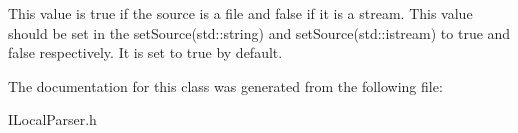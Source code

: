 This value is true if the source is a file and false if it is a stream. This value should be set in the set\+Source(std\+::string) and set\+Source(std\+::istream) to true and false respectively. It is set to true by default. 

The documentation for this class was generated from the following file\+:\begin{DoxyCompactItemize}
\item 
I\+Local\+Parser.\+h\end{DoxyCompactItemize}

